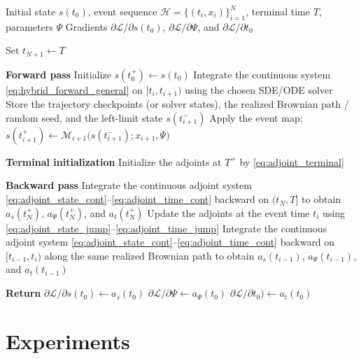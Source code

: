 \documentclass[11pt]{article}
\theoremstyle{definition}
\numberwithin{equation}{section}
\numberwithin{theorem}{section}
\numberwithin{proposition}{section}
\numberwithin{lemma}{section}
\numberwithin{corollary}{section}
\numberwithin{definition}{section}
\numberwithin{remark}{section}
\newcommand{\1}{\mathbbm{1}}
\begin{document}
\begin{algorithm}[t]
\caption{Forward--backward adjoint method for the proposed latent jump--diffusion marked point process}
\label{alg:neural_jsde_adjoint}
\begin{algorithmic}[1]
\Require Initial state $s(t_0)$, event sequence $\mathcal H=\{(t_i,x_i)\}_{i=1}^N$, terminal time $T$, parameters $\Psi$
\Ensure Gradients $\partial \mathcal L/\partial s(t_0)$, $\partial \mathcal L/\partial \Psi$, and $\partial \mathcal L/\partial t_0$

\State Set $t_{N+1}\leftarrow T$

\State \textbf{Forward pass}
\State Initialize $s(t_0^+)\leftarrow s(t_0)$
    \State Integrate the continuous system \eqref{eq:hybrid_forward_general} on $[t_i,t_{i+1})$ using the chosen SDE/ODE solver
    \State Store the trajectory checkpoints (or solver states), the realized Brownian path / random seed, and the left-limit state $s(t_{i+1}^-)$
        \State Apply the event map:
        \State $s(t_{i+1}^+)\leftarrow \mathcal M_{i+1}\bigl(s(t_{i+1}^-);x_{i+1},\Psi\bigr)$
    \EndIf
\EndFor

\State \textbf{Terminal initialization}
\State Initialize the adjoints at $T^+$ by \eqref{eq:adjoint_terminal}

\State \textbf{Backward pass}
\State Integrate the continuous adjoint system \eqref{eq:adjoint_state_cont}--\eqref{eq:adjoint_time_cont} backward on $(t_N,T]$ to obtain $a_s(t_N^+)$, $a_\Psi(t_N^+)$, and $a_t(t_N^+)$
    \State Update the adjoints at the event time $t_i$ using \eqref{eq:adjoint_state_jump}--\eqref{eq:adjoint_time_jump}
    \State Integrate the continuous adjoint system \eqref{eq:adjoint_state_cont}--\eqref{eq:adjoint_time_cont} backward on $[t_{i-1},t_i)$ along the same realized Brownian path to obtain $a_s(t_{i-1})$, $a_\Psi(t_{i-1})$, and $a_t(t_{i-1})$
\EndFor

\State \textbf{Return}
\State $\partial \mathcal L/\partial s(t_0)\leftarrow a_s(t_0)$
\State $\partial \mathcal L/\partial \Psi\leftarrow a_\Psi(t_0)$
\State $\partial \mathcal L/\partial t_0)\leftarrow a_t(t_0)$
\end{algorithmic}
\end{algorithm}




\section{Experiments}
\end{document}
